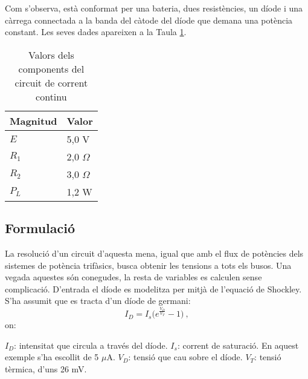 Com s'observa, està conformat per una bateria, dues resistències, un díode i una càrrega connectada a la banda del càtode del díode que demana una potència constant. Les seves dades apareixen a la Taula \ref{tab:Diode1}.

\begin{table}[!htb]
    \begin{center}
    \begin{tabular}{ll}
    \hline
    Magnitud & Valor\\
    \hline
    \hline
    $E$ & 5,0 V\\
    $R_1$ & 2,0 $\Omega$\\
    $R_2$ & 3,0 $\Omega$\\
    $P_L$ & 1,2 W\\
    \hline 
    \end{tabular}
    \caption{Valors dels components del circuit de corrent continu}
    \label{tab:Diode1}
    \end{center}
  \end{table}

\subsection{Formulació}
La resolució d'un circuit d'aquesta mena, igual que amb el flux de potències dels sistemes de potència trifàsics, busca obtenir les tensions a tots els busos. Una vegada aquestes són conegudes, la resta de variables es calculen sense complicació. D'entrada el díode es modelitza per mitjà de l'equació de Shockley. S'ha assumit que es tracta d'un díode de germani:
\begin{equation}
    I_D=I_s\biggl(e^{\frac{V_D}{V_T}}-1\biggr)\ , 
    \label{eq:shock1}
\end{equation}
on:

$I_D$: intensitat que circula a través del díode.
\vs
$I_s$: corrent de saturació. En aquest exemple s'ha escollit de 5 $\mu$A.
\vs
$V_D$: tensió que cau sobre el díode.
\vs
$V_T$: tensió tèrmica, d'uns 26 mV.

